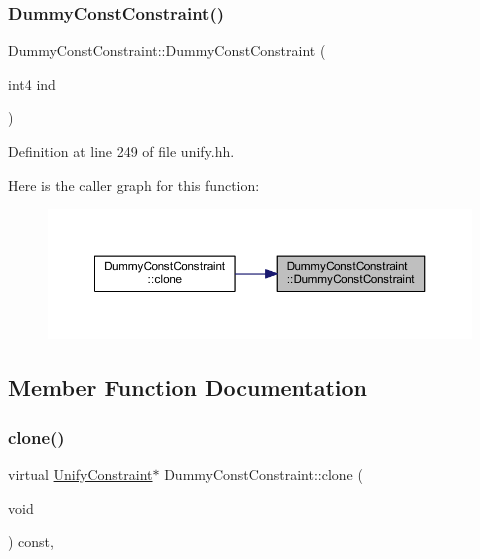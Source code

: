 \subsubsection{\texorpdfstring{DummyConstConstraint()}{DummyConstConstraint()}}
{\footnotesize\ttfamily Dummy\+Const\+Constraint\+::\+Dummy\+Const\+Constraint (\begin{DoxyParamCaption}\item[{int4}]{ind }\end{DoxyParamCaption})\hspace{0.3cm}{\ttfamily [inline]}}



Definition at line 249 of file unify.\+hh.

Here is the caller graph for this function\+:
\nopagebreak
\begin{figure}[H]
\begin{center}
\leavevmode
\includegraphics[width=350pt]{class_dummy_const_constraint_a1a9796613713f8ef62ca22887ea2b337_icgraph}
\end{center}
\end{figure}


\subsection{Member Function Documentation}
\mbox{\label{class_dummy_const_constraint_acf3f66f2d189379f19ee11c14278ab3d}} 
\subsubsection{\texorpdfstring{clone()}{clone()}}
{\footnotesize\ttfamily virtual \mbox{\hyperlink{class_unify_constraint}{Unify\+Constraint}}$\ast$ Dummy\+Const\+Constraint\+::clone (\begin{DoxyParamCaption}\item[{void}]{ }\end{DoxyParamCaption}) const\hspace{0.3cm}{\ttfamily [inline]}, {\ttfamily [virtual]}}



